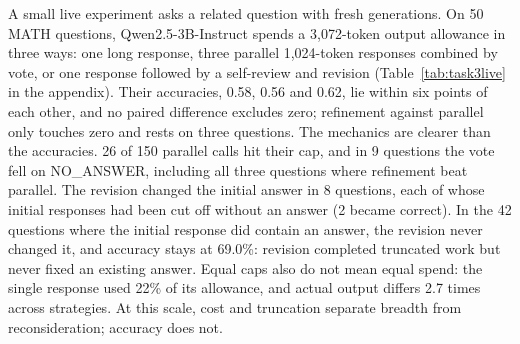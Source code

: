A small live experiment asks a related question with fresh generations. On 50 MATH questions, Qwen2.5-3B-Instruct spends a 3,072-token output allowance in three ways: one long response, three parallel 1,024-token responses combined by vote, or one response followed by a self-review and revision (Table~\ref{tab:task3live} in the appendix). Their accuracies, 0.58, 0.56 and 0.62, lie within six points of each other, and no paired difference excludes zero; refinement against parallel only touches zero and rests on three questions. The mechanics are clearer than the accuracies. 26 of 150 parallel calls hit their cap, and in 9 questions the vote fell on NO\_ANSWER, including all three questions where refinement beat parallel. The revision changed the initial answer in 8 questions, each of whose initial responses had been cut off without an answer (2 became correct). In the 42 questions where the initial response did contain an answer, the revision never changed it, and accuracy stays at 69.0\%: revision completed truncated work but never fixed an existing answer. Equal caps also do not mean equal spend: the single response used 22\% of its allowance, and actual output differs 2.7 times across strategies. At this scale, cost and truncation separate breadth from reconsideration; accuracy does not.

